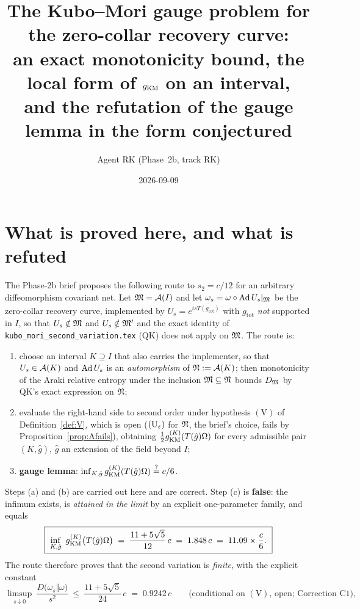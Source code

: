 \documentclass[11pt]{article}
\title{The Kubo--Mori gauge problem for the zero-collar recovery curve:\\
an exact monotonicity bound, the local form of $\gKM$ on an interval,\\
and the refutation of the gauge lemma in the form conjectured}
\author{Agent RK (Phase~2b, track RK)}
\date{2026-09-09}
\newcommand{\gtot}{g_{\mathrm{tot}}}\newcommand{\ktil}{\tilde k}
\newcommand{\gKM}{g_{\mathrm{KM}}}\newcommand{\gB}{g_{\mathrm B}}
\begin{document}
\maketitle
\tableofcontents

\section{What is proved here, and what is refuted}\label{sec:scope}

The Phase-2b brief proposes the following route to $s_2=c/12$ for an arbitrary diffeomorphism covariant net.
Let $\mathfrak M=\mathcal A(I)$ and let $\omega_s=\omega\circ\operatorname{Ad} U_s|_{\mathfrak M}$ be the zero-collar recovery curve, implemented by
$U_s=e^{is\overline{T(\gtot)}}$ with $\gtot$ \emph{not} supported in $I$, so that $U_s\notin\mathfrak M$ and
$U_s\notin\mathfrak M'$ and the exact identity of \texttt{kubo\_mori\_second\_variation.tex} (QK) does not apply on
$\mathfrak M$.  The route is:
\begin{enumerate}[leftmargin=2.2em,label=(\alph*)]
\item choose an interval $K\supseteq I$ that also carries the implementer, so that $U_s\in\mathcal A(K)$ and $\operatorname{Ad} U_s$
 is an \emph{automorphism} of $\mathfrak N:=\mathcal A(K)$; then monotonicity of the Araki relative entropy under the
 inclusion $\mathfrak M\subseteq\mathfrak N$ bounds $D_{\mathfrak M}$ by QK's exact expression on $\mathfrak N$;
\item evaluate the right-hand side to second order under hypothesis $(\mathrm V)$ of Definition~\ref{def:V}, which is open ($(\mathrm U_\varepsilon)$ for $\mathfrak N$, the brief's choice, fails by Proposition~\ref{prop:Afails}), obtaining
 $\tfrac12\gKM^{(K)}(T(\hat g)\Om)$ for every admissible pair $(K,\hat g)$, $\hat g$ an extension of the
 field beyond $I$;
\item \textbf{gauge lemma}: $\inf_{K,\hat g}\gKM^{(K)}(T(\hat g)\Om)\overset?=c/6$.
\end{enumerate}
Steps (a) and (b) are carried out here and are correct.  Step (c) is \textbf{false}: the infimum exists, is
\emph{attained in the limit} by an explicit one-parameter family, and equals
\begin{equation}\label{eq:mainvalue}
 \boxed{\ \inf_{K,\hat g}\ \gKM^{(K)}\bigl(T(\hat g)\Om\bigr)\;=\;\frac{11+5\sqrt5}{12}\,c\;=\;1.848\,c
 \;=\;11.09\times\frac c6 .\ }
\end{equation}
The route therefore proves that the second variation is \emph{finite}, with the explicit constant
\begin{equation}\label{eq:mainbound}
 \limsup_{s\downarrow0}\ \frac{D\bigl(\omega_s\Vert\omega\bigr)}{s^2}\ \le\
 \frac{11+5\sqrt5}{24}\,c\;=\;0.9242\,c
 \qquad\text{(conditional on $(\mathrm V)$, open; Correction~C1)},
\end{equation}
\end{document}
